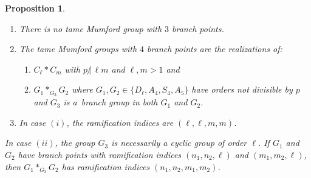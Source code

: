 \documentclass[10pt,a4paper]{amsart}
\numberwithin{equation}{section}
\newtheorem{Proposition}[Theorem]{Proposition}
\begin{document}
 \begin{Proposition} \label{5.3} \quad
\begin{enumerate}\itemsep=0pt
\item[$(1)$] There is no tame Mumford group with $3$ branch points.
\item[$(2)$] The tame Mumford groups with $4$ branch points are the realizations of:
\begin{enumerate}\itemsep=0pt
\item[$(i)$] $C_\ell \ast C_m$ with $p\,{\not |}\, \ell m$ and $\ell, m >1$ and
\item[$(ii)$] $G_1\ast _{G_3} G_2$ where $G_1,G_2\in \{D_\ell ,A_4,S_4,A_5\}$ have orders not divisible by $p$ and $G_3$ is a~branch group in both $G_1$ and $G_2$.
\end{enumerate}
\item[$(3)$] In case $(i)$, the ramification indices are $(\ell ,\ell , m,m)$.
\end{enumerate}
In case $(ii)$, the group $G_3$ is necessarily a cyclic group of order $\ell$. If $G_1$ and $G_2$ have branch points with ramification indices $(n_1,n_2,\ell)$ and $(m_1,m_2,\ell)$, then $G_1\ast_{G_3}G_2$ has ramification indices $(n_1,n_2,m_1,m_2)$.
\end{Proposition}
\end{document}
